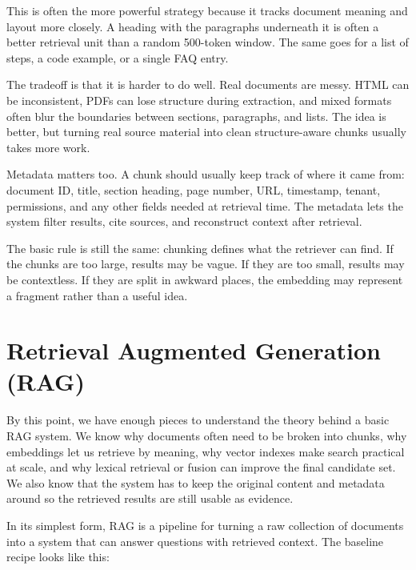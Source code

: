 \documentclass[12pt]{article}
\begin{document}
This is often the more powerful strategy because it tracks document
meaning and layout more closely. A heading with the paragraphs underneath
it is often a better retrieval unit than a random 500-token window. The
same goes for a list of steps, a code example, or a single FAQ entry.

The tradeoff is that it is harder to do well. Real documents are messy.
HTML can be inconsistent, PDFs can lose structure during extraction, and
mixed formats often blur the boundaries between sections, paragraphs, and
lists. The idea is better, but turning real source material into clean
structure-aware chunks usually takes more work.

Metadata matters too. A chunk should usually keep track of where it came
from: document ID, title, section heading, page number, URL, timestamp,
tenant, permissions, and any other fields needed at retrieval time. The
metadata lets the system filter results, cite sources, and reconstruct
context after retrieval.

The basic rule is still the same: chunking defines what the retriever can
find. If the chunks are too large, results may be vague. If they are too
small, results may be contextless. If they are split in awkward places,
the embedding may represent a fragment rather than a useful idea.

\section{Retrieval Augmented Generation (RAG)}

By this point, we have enough pieces to understand the theory behind a
basic RAG system. We know why documents often need to be broken into
chunks, why embeddings let us retrieve by meaning, why vector indexes make
search practical at scale, and why lexical retrieval or fusion can
improve the final candidate set. We also know that the system has to keep
the original content and metadata around so the retrieved results are
still usable as evidence.

In its simplest form, RAG is a pipeline for turning a raw collection of
documents into a system that can answer questions with retrieved context.
The baseline recipe looks like this:
\end{document}

